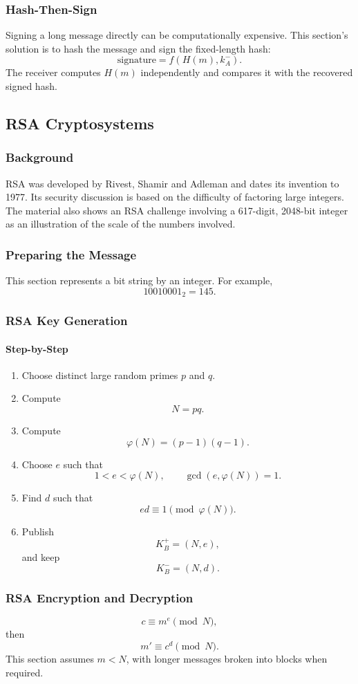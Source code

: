 \documentclass[12pt]{article}
\newcommand{\Step}{\paragraph{Step-by-Step}}
\begin{document}
\subsubsection{Hash-Then-Sign}
Signing a long message directly can be computationally expensive. This section's solution is to hash the message and sign the fixed-length hash:
\[
\text{signature}=f(H(m),k_A^-).
\]
The receiver computes $H(m)$ independently and compares it with the recovered signed hash.

\subsection{RSA Cryptosystems}
\subsubsection{Background}
RSA was developed by Rivest, Shamir and Adleman  and dates its invention to 1977. Its security discussion is based on the difficulty of factoring large integers. The material also shows an RSA challenge involving a 617-digit, 2048-bit integer as an illustration of the scale of the numbers involved.

\subsubsection{Preparing the Message}
This section represents a bit string by an integer. For example,
\[
10010001_2=145.
\]

\subsubsection{RSA Key Generation}
\Step
\begin{enumerate}
    \item Choose distinct large random primes $p$ and $q$.
    \item Compute
    \[
    N=pq.
    \]
    \item Compute
    \[
    \varphi(N)=(p-1)(q-1).
    \]
    \item Choose $e$ such that
    \[
    1<e<\varphi(N),\qquad\gcd(e,\varphi(N))=1.
    \]
    \item Find $d$ such that
    \[
    ed\equiv1\pmod{\varphi(N)}.
    \]
    \item Publish
    \[
    K_B^+=(N,e),
    \]
    and keep
    \[
    K_B^-=(N,d).
    \]
\end{enumerate}

\subsubsection{RSA Encryption and Decryption}
\[
c\equiv m^e\pmod N,
\]
then
\[
m'\equiv c^d\pmod N.
\]
This section assumes $m<N$, with longer messages broken into blocks when required.
\end{document}

